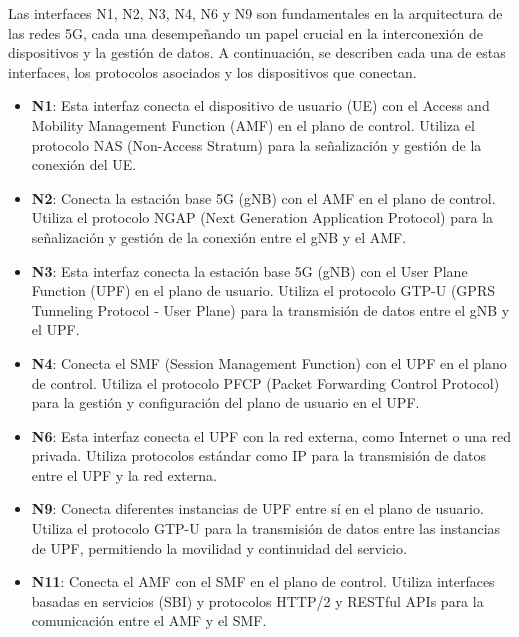Las interfaces N1, N2, N3, N4, N6 y N9 son fundamentales en la arquitectura de las redes 5G, cada una desempeñando un papel crucial en la interconexión de dispositivos y la gestión de datos. A continuación, se describen cada una de estas interfaces, los protocolos asociados y los dispositivos que conectan.
\begin{itemize}
    \item \textbf{N1}: Esta interfaz conecta el dispositivo de usuario (UE) con el Access and Mobility Management Function (AMF) en el plano de control. Utiliza el protocolo NAS (Non-Access Stratum) para la señalización y gestión de la conexión del UE.
    \item \textbf{N2}: Conecta la estación base 5G (gNB) con el AMF en el plano de control. Utiliza el protocolo NGAP (Next Generation Application Protocol) \cite{3gpp.ts.38.401} para la señalización y gestión de la conexión entre el gNB y el AMF.
    \item \textbf{N3}: Esta interfaz conecta la estación base 5G (gNB) con el User Plane Function (UPF) en el plano de usuario. Utiliza el protocolo GTP-U (GPRS Tunneling Protocol - User Plane) para la transmisión de datos entre el gNB y el UPF.
    \item \textbf{N4}: Conecta el SMF (Session Management Function) con el UPF en el plano de control. Utiliza el protocolo PFCP (Packet Forwarding Control Protocol) \cite{3gpp.29.244} para la gestión y configuración del plano de usuario en el UPF.
    \item \textbf{N6}: Esta interfaz conecta el UPF con la red externa, como Internet o una red privada. Utiliza protocolos estándar como IP para la transmisión de datos entre el UPF y la red externa.
    \item \textbf{N9}: Conecta diferentes instancias de UPF entre sí en el plano de usuario. Utiliza el protocolo GTP-U para la transmisión de datos entre las instancias de UPF, permitiendo la movilidad y continuidad del servicio.
    \item \textbf{N11}: Conecta el AMF con el SMF en el plano de control. Utiliza interfaces basadas en servicios (SBI) y protocolos HTTP/2 y RESTful APIs para la comunicación entre el AMF y el SMF.
\end{itemize}

